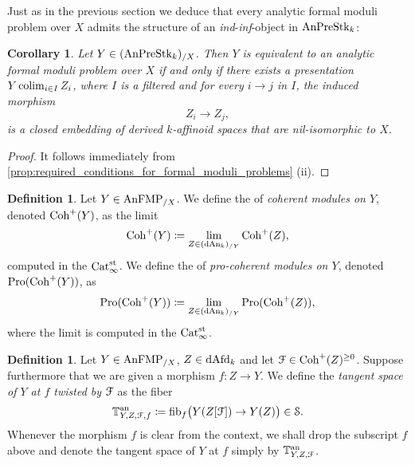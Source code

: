 \documentclass[10pt,a4paper,reqno]{amsart} %
\theoremstyle{plain}
\newtheorem{cor}[thm]{Corollary}
\theoremstyle{definition}
\newtheorem{defin}[thm]{Definition}
\theoremstyle{remark}
\numberwithin{equation}{section}
\begin{document}
Just as in the previous section we deduce that every analytic formal moduli problem over $X$ admits the structure of an \emph{ind}-\emph{inf}-object
in $\mathrm{AnPreStk}_k$:

\begin{cor} \label{cor:formal_moduli_problems_over_X_are_ind_inf_objects}
    Let $Y \in (\mathrm{AnPreStk}_k)_{/X}$. Then $Y$ is equivalent to an analytic formal moduli problem over $X$ if and only if there exists
    a presentation $Y \operatorname*{colim}_{i \in I} Z_i$, where $I$ is a filtered \infcat and for every $i \to j$ in $I$, the induced morphism
        \[
          Z_i \to Z_j,  
        \]
    is a closed embedding of derived $k$-affinoid spaces that are nil-isomorphic to $X$.
\end{cor}

\begin{proof}
    It follows immediately from \cref{prop:required_conditions_for_formal_moduli_problems} (ii).
\end{proof}

\begin{defin}
    Let $Y \in \mathrm{AnFMP}_{/X}$. We define the \infcat of \emph{coherent modules on $Y$}, denoted $\mathrm{Coh}^+(Y)$, as the limit
        \[
            \mathrm{Coh}^+(Y) \coloneqq \lim_{Z \in (\mathrm{dAn}_k)_{/Y}}  \mathrm{Coh}^+(Z),
        \]
    computed in the \infcat $\mathrm{Cat}_{\infty}^{\mathrm{st}}$. We define the \infcat of \emph{pro-coherent modules on $Y$}, denoted $\mathrm{Pro}(\mathrm{Coh}^+(Y))$, as
        \[
            \mathrm{Pro}(\mathrm{Coh}^+(Y)) \coloneqq \lim_{Z \in (\mathrm{dAn}_k)_{/Y}} \mathrm{Pro}(\mathrm{Coh}^+(Z)),  
        \]
    where the limit is computed in the \infcat $\mathrm{Cat}_{\infty}^{\mathrm{st}}$.
\end{defin}

\begin{defin} Let $Y \in \mathrm{AnFMP}_{/X}$, $Z \in \mathrm{dAfd}_k$ and let $\mathcal F \in \mathrm{Coh}^+(Z)^{\ge 0}$. Suppose furthermore that we are given a morphism $f \colon Z \to Y$.
    We define the \emph{tangent space of $Y$ at $f$ twisted by $\mathcal F$} as the fiber
        \[
            \mathbb T^\mathrm{an}_{Y, Z, \mathcal F,f} \coloneqq \mathrm{fib}_f\big( Y(Z[\mathcal F]) \to Y(Z) \big) 
            \in \mathcal S.  
        \]
    Whenever the morphism $f$ is clear from the context, we shall drop the subscript $f$ above and denote the tangent space of $Y$ at $f$ simply by $\mathbb T^\mathrm{an}_{Y, Z, \mathcal F}$.
\end{defin}
\end{document}
